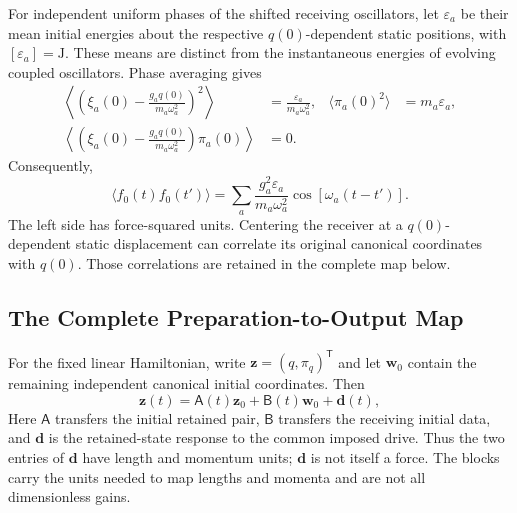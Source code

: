 For independent uniform phases of the shifted receiving oscillators, let $\varepsilon_a$ be their mean initial energies about the respective $q(0)$-dependent static positions, with $[\varepsilon_a]=\mathrm J$. These means are distinct from the instantaneous energies of evolving coupled oscillators. Phase averaging gives
\begin{equation}
\begin{aligned}
 \left\langle\left(\xi_a(0)-\frac{g_aq(0)}{m_a\omega_a^2}\right)^2\right\rangle
 &=\frac{\varepsilon_a}{m_a\omega_a^2},
 &\langle\pi_a(0)^2\rangle&=m_a\varepsilon_a,\\
 \left\langle\left(\xi_a(0)-\frac{g_aq(0)}{m_a\omega_a^2}\right)
 \pi_a(0)\right\rangle&=0.
\end{aligned}
\end{equation}
Consequently,
\begin{equation}
 \boxed{
 \langle f_0(t)f_0(t')\rangle
 =\sum_a\frac{g_a^2\varepsilon_a}{m_a\omega_a^2}
 \cos[\omega_a(t-t')]
 }.
\label{eq:DMR_force_covariance}
\end{equation}
The left side has force-squared units. Centering the receiver at a $q(0)$-dependent static displacement can correlate its original canonical coordinates with $q(0)$. Those correlations are retained in the complete map below.

\subsection{The Complete Preparation-to-Output Map}

For the fixed linear Hamiltonian, write $\mathbf z=(q,\pi_q)^{\mathsf T}$ and let $\mathbf w_0$ contain the remaining independent canonical initial coordinates. Then
\begin{equation}
 \mathbf z(t)=\mathsf A(t)\mathbf z_0+\mathsf B(t)\mathbf w_0+\mathbf d(t),
\label{eq:DMR_linear_state_map}
\end{equation}
Here $\mathsf A$ transfers the initial retained pair, $\mathsf B$ transfers the receiving initial data, and $\mathbf d$ is the retained-state response to the common imposed drive. Thus the two entries of $\mathbf d$ have length and momentum units; $\mathbf d$ is not itself a force. The blocks carry the units needed to map lengths and momenta and are not all dimensionless gains.

